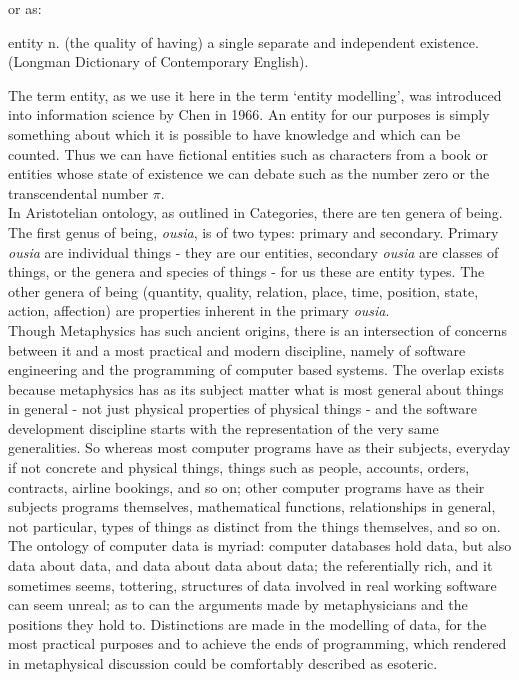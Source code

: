 or as:

\begin{erquote}
entity n. (the quality of having) a single separate and independent existence. (Longman Dictionary of Contemporary English).
\end{erquote}

\noindent The term entity, as we use it here in the term `entity modelling', was introduced into information science by Chen in 1966. An entity for our purposes is simply something about which it is possible to have knowledge and which can be counted. Thus we can have fictional entities such as characters from a book or entities whose state of existence we can debate such as the number zero or the transcendental number $\pi$.\\

\noindent In Aristotelian ontology, as outlined in Categories, there are ten genera of being. The first genus of 
being, \textit{ousia}, is of two types: primary and secondary. Primary \textit{ousia} are individual things - they are 
our entities, secondary \textit{ousia} are classes of things, or the genera and species of things - for us these are 
entity types. The other genera of being (quantity, quality, relation, place, time, position, state, action, affection) 
are properties inherent in the primary \textit{ousia}. \\

\noindent Though Metaphysics has such ancient origins, there is an intersection of concerns between it and a most practical and modern discipline, namely of software engineering and the programming of computer based systems. The overlap exists because metaphysics has as its subject matter what is most general about things in general - not just physical properties of physical things - and the software development discipline starts with the representation of the very same generalities. So whereas most computer programs have as their subjects, everyday if not concrete and physical things, things such as people, accounts, orders, contracts, airline bookings, and so on; other computer programs have as their subjects programs themselves, mathematical functions, relationships in general, not particular, types of things as distinct from the things themselves, and so on. \\

\noindent The ontology of computer data is myriad: computer databases hold data, but also data about data, and data about data about data; the referentially rich, and it sometimes seems, tottering, structures of data involved in real working software can seem unreal; as to can the arguments made by metaphysicians and the positions they hold to. Distinctions are made in the modelling of data, for the most practical purposes and to achieve the ends of programming, which rendered in metaphysical discussion could be comfortably described as esoteric.\\

